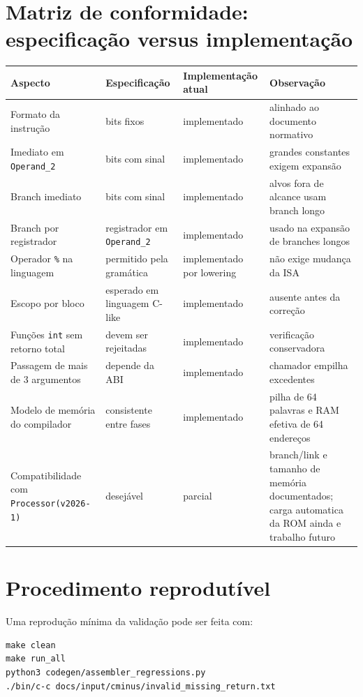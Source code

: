 \documentclass[12pt,a4paper]{article}
\begin{document}
\appendix

\section{Matriz de conformidade: especificação versus implementação}
\begin{longtable}{>{\raggedright\arraybackslash}p{} >{\raggedright\arraybackslash}p{} >{\raggedright\arraybackslash}p{} >{\raggedright\arraybackslash}p{}}
\toprule
\textbf{Aspecto} & \textbf{Especificação} & \textbf{Implementação atual} & \textbf{Observação} \\
\midrule
\endhead
Formato da instrução & 32 bits fixos & implementado & alinhado ao documento normativo \\
Imediato em \texttt{Operand\_2} & 10 bits com sinal & implementado & grandes constantes exigem expansão \\
Branch imediato & 10 bits com sinal & implementado & alvos fora de alcance usam branch longo \\
Branch por registrador & registrador em \texttt{Operand\_2} & implementado & usado na expansão de branches longos \\
Operador \texttt{\%} na linguagem & permitido pela gramática & implementado por lowering & não exige mudança da ISA \\
Escopo por bloco & esperado em linguagem C-like & implementado & ausente antes da correção \\
Funções \texttt{int} sem retorno total & devem ser rejeitadas & implementado & verificação conservadora \\
Passagem de mais de 3 argumentos & depende da ABI & implementado & chamador empilha excedentes \\
Modelo de memória do compilador & consistente entre fases & implementado & pilha de 64 palavras e RAM efetiva de 64 endereços \\
Compatibilidade com \texttt{Processor(v2026-1)} & desejável & parcial & branch/link e tamanho de memória documentados; carga automatica da ROM ainda e trabalho futuro \\
\bottomrule
\end{longtable}

\section{Procedimento reprodutível}
Uma reprodução mínima da validação pode ser feita com:
\begin{verbatim}
make clean
make run_all
python3 codegen/assembler_regressions.py
./bin/c-c docs/input/cminus/invalid_missing_return.txt
\end{verbatim}
\end{document}
